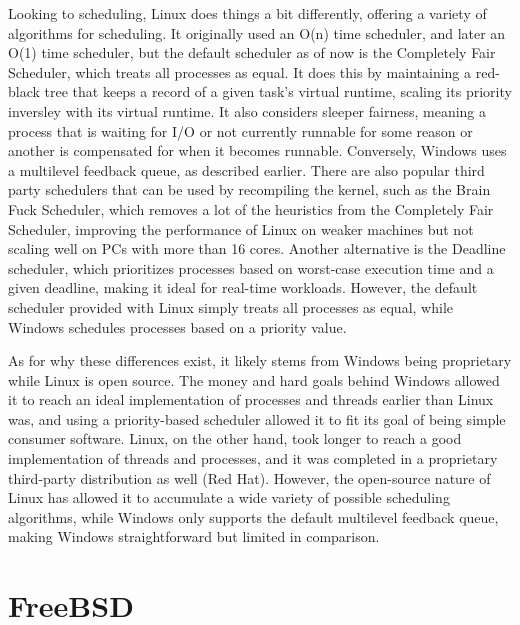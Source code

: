 \documentclass[draftclsnofoot,onecolumn,journal,letterpaper,10pt]{IEEEtran}
\begin{document}
Looking to scheduling, Linux does things a bit differently, offering a variety of algorithms for scheduling. It originally used an O(n) time scheduler, and later an O(1) time scheduler, but the default scheduler as of now is the Completely Fair Scheduler, which treats all processes as equal. It does this by maintaining a red-black tree that keeps a record of a given task's virtual runtime, scaling its priority inversley with its virtual runtime. It also considers sleeper fairness, meaning a process that is waiting for I/O or not currently runnable for some reason or another is compensated for when it becomes runnable. Conversely, Windows uses a multilevel feedback queue, as described earlier. There are also popular third party schedulers that can be used by recompiling the kernel, such as the Brain Fuck Scheduler, which removes a lot of the heuristics from the Completely Fair Scheduler, improving the performance of Linux on weaker machines but not scaling well on PCs with more than 16 cores\cite{bfs}. Another alternative is the Deadline scheduler, which prioritizes processes based on worst-case execution time and a given deadline, making it ideal for real-time workloads\cite{deadline}. However, the default scheduler provided with Linux simply treats all processes as equal, while Windows schedules processes based on a priority value.

As for why these differences exist, it likely stems from Windows being proprietary while Linux is open source. The money and hard goals behind Windows allowed it to reach an ideal implementation of processes and threads earlier than Linux was, and using a priority-based scheduler allowed it to fit its goal of being simple consumer software. Linux, on the other hand, took longer to reach a good implementation of threads and processes, and it was completed in a proprietary third-party distribution as well (Red Hat). However, the open-source nature of Linux has allowed it to accumulate a wide variety of possible scheduling algorithms, while Windows only supports the default multilevel feedback queue, making Windows straightforward but limited in comparison.

\section{FreeBSD}
\end{document}
